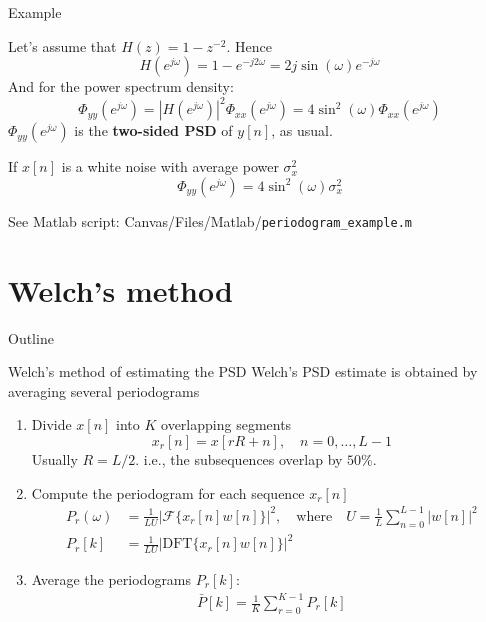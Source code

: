 \documentclass[10pt]{beamer}
\begin{document}
\begin{frame}{Example}

\begin{center}
\end{center}

Let's assume that $H(z) = 1 - z^{-2}$. Hence
\begin{equation*}
	H(e^{j\omega}) = 1 - e^{-j2\omega} = 2j\sin(\omega)e^{-j\omega}
\end{equation*}
And for the power spectrum density:
\begin{equation*}
	\Phi_{yy}(e^{j\omega}) = |H(e^{j\omega})|^2\Phi_{xx}(e^{j\omega}) = 4\sin^2(\omega)\Phi_{xx}(e^{j\omega})
\end{equation*}
$\Phi_{yy}(e^{j\omega})$ is the \textbf{two-sided PSD} of $y[n]$, as usual.
\vspace{0.25cm}

If $x[n]$ is a white noise with average power $\sigma_x^2$
\begin{equation*}
\Phi_{yy}(e^{j\omega}) = 4\sin^2(\omega)\sigma_x^2
\end{equation*}

See Matlab script: Canvas/Files/Matlab/\texttt{periodogram\_example.m}
\end{frame}

\section{Welch's method}
\begin{frame}{Outline}
\tableofcontents[currentsection]
\end{frame}
\begin{frame}{Welch's method of estimating the PSD}
	Welch's PSD estimate is obtained by averaging several periodograms
	
	\begin{enumerate}
	\item Divide $x[n]$ into $K$ overlapping segments
		\begin{equation*}
			x_r[n] = x[rR + n], \quad n = 0, \ldots, L-1
		\end{equation*}
		Usually $R = L/2$. i.e., the subsequences overlap by $50\%$.
	\item Compute the periodogram for each sequence $x_r[n]$
		\begin{align*}
			P_r(\omega) &= \frac{1}{LU}|\mathcal{F}\{x_r[n]w[n]\}|^2, \quad\text{where}\quad U = \frac{1}{L}\sum_{n = 0}^{L-1}|w[n]|^2 \\
			P_r[k] &= \frac{1}{LU}|\mathrm{DFT}\{x_r[n]w[n]\}|^2
		\end{align*}
	\item Average the periodograms $P_r[k]$:
		\begin{align*}
			\bar{P}[k] = \frac{1}{K}\sum_{r = 0}^{K-1}P_r[k]
		\end{align*}
	\end{enumerate}
\end{frame}
\end{document}
